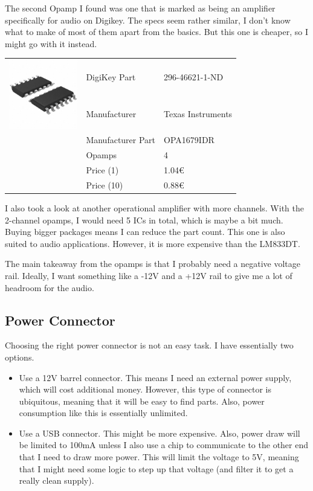 \documentclass[a4paper]{article}
\begin{document}
The second Opamp I found was one that is marked as being an amplifier specifically for audio on Digikey. The specs seem rather similar, I don't know what to make of most of them apart from the basics. But this one is cheaper, so I might go with it instead.

\begin{center}
\begin{tabular}{@{}p{3cm}p{3cm}p{3cm}@{}}
\multirow{2}{3cm}{\includegraphics[width=3cm]{images/soic14}}
& DigiKey Part & 296-46621-1-ND\\
& Manufacturer & Texas Instruments\\
& Manufacturer Part & OPA1679IDR\\
& Opamps & 4\\
& Price (1) & 1.04€\\
& Price (10) & 0.88€\\
\end{tabular}
\end{center}

I also took a look at another operational amplifier with more channels. With the 2-channel opamps, I would need 5 ICs in total, which is maybe a bit much. Buying bigger packages means I can reduce the part count. This one is also suited to audio applications. However, it is more expensive than the LM833DT.

The main takeaway from the opamps is that I probably need a negative voltage rail. Ideally, I want something like a -12V and a +12V rail to give me a lot of headroom for the audio.

\subsection{Power Connector}

Choosing the right power connector is not an easy task. I have essentially two options.

\begin{itemize}
  \item Use a 12V barrel connector. This means I need an external power supply, which will cost additional money. However, this type of connector is ubiquitous, meaning that it will be easy to find parts. Also, power consumption like this is essentially unlimited.
  \item Use a USB connector. This might be more expensive. Also, power draw will be limited to 100mA unless I also use a chip to communicate to the other end that I need to draw more power. This will limit the voltage to 5V, meaning that I might need some logic to step up that voltage (and filter it to get a really clean supply).
\end{itemize}
\end{document}
